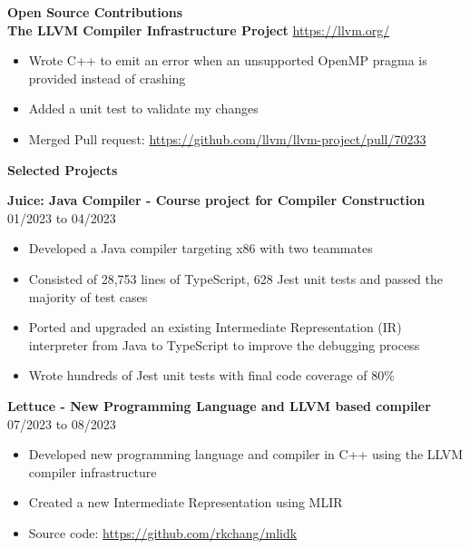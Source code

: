 \documentclass[10pt]{article}
\begin{document}
{\Large\textbf{Open Source Contributions}}\space \hrulefill
\\
\textbf{The LLVM Compiler Infrastructure Project} \hfill \url{https://llvm.org/}
\begin{itemize}[noitemsep]
    \item Wrote C++ to emit an error when an unsupported OpenMP pragma is provided instead of crashing
    \item Added a unit test to validate my changes
    \item Merged Pull request: \url{https://github.com/llvm/llvm-project/pull/70233}
\end{itemize}

{\Large\textbf{Selected Projects}}\space \hrulefill

\textbf{Juice: Java Compiler - Course project for Compiler Construction} \hfill 01/2023 to 04/2023
\begin{itemize}[noitemsep]
    \item Developed a Java compiler targeting x86 with two teammates
    \item Consisted of 28,753 lines of TypeScript, 628 Jest unit tests and passed the majority of test cases
    \item Ported and upgraded an existing Intermediate Representation (IR) interpreter from Java to TypeScript to improve the debugging process
    \item Wrote hundreds of Jest unit tests with final code coverage of 80\%
\end{itemize}

\textbf{Lettuce - New Programming Language and LLVM based compiler} \hfill 07/2023 to 08/2023
\begin{itemize}[noitemsep]
    \item Developed new programming language and compiler in C++ using the LLVM compiler infrastructure
    \item Created a new Intermediate Representation using MLIR
    \item Source code: \url{https://github.com/rkchang/mlidk}
\end{itemize}



\end{document}
